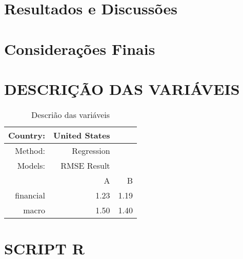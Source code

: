 \documentclass[
	12pt,				%
	openright,			%
	oneside,      %
	a4paper,			%
	english,			%
	french,				%
	spanish,			%
	brazil,				%
	]{abntex2}\usepackage[]{graphicx}\usepackage[]{xcolor}
\begin{document}
\chapter{Resultados e Discussões}





\chapter{Considerações Finais}






%
%



\begin{apendicesenv}

\partapendices

\chapter{DESCRIÇÃO DAS VARIÁVEIS}

\begin{table}[ht]
\centering
\begin{tabular}{rrr}
  \hline
  Country: & United States & \\
 \hline Method: & Regression &  \\
 \hline Models: & RMSE Result &  \\
 \hline & A & B \\
 \hline
financial & 1.23 & 1.19 \\
  macro & 1.50 & 1.40 \\
   \hline
\end{tabular} \caption{Descrião das variáveis}
\end{table}


\chapter{SCRIPT R}



\end{apendicesenv}
\end{document}
